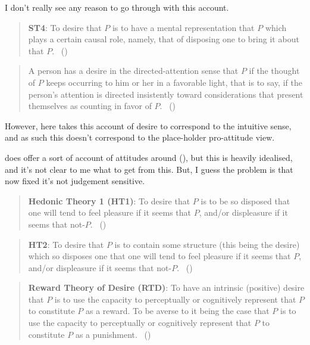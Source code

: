 \documentclass[10pt]{article}
\begin{document}
{\color{red}
  I don't really see any reason to go through with this account.
}

\begin{quote}
  \textbf{ST4}:
  To desire that \(P\) is to have a mental representation that \(P\) which plays a certain causal role, namely, that of disposing one to bring it about that \(P\).\nolinebreak
  \mbox{ }\hfill(\citeyear[24]{Schroeder:2004aa})
\end{quote}

\begin{quote}
  A person has a desire in the directed-attention sense that \(P\) if the thought of \(P\) keeps occurring to him or her in a favorable light, that is to say, if the person’s attention is directed insistently toward considerations that present themselves as counting in favor of \(P\).\nolinebreak
  \mbox{ }(\citeyear[39]{Scanlon:1998aa})
\end{quote}

However, here \citeauthor{Scanlon:1998aa} takes this account of desire to correspond to the intuitive sense, and as such this doesn't correspond to the place-holder pro-attitude view.

\citeauthor{Scanlon:1998aa} does offer a sort of account of attitudes around (\citeyear[20]{Scanlon:1998aa}), but this is heavily idealised, and it's not clear to me what to get from this.
But, I guess the problem is that now fixed it's not judgement sensitive.


\begin{quote}
  \textbf{Hedonic Theory 1 (HT1)}:
  To desire that \(P\) is to be so disposed that one will tend to feel pleasure if it seems that \(P\), and/or displeasure if it seems that not-\(P\).\nolinebreak
  \mbox{ }\hfill(\citeyear[27]{Schroeder:2004aa})
\end{quote}

\begin{quote}
  \textbf{HT2}:
  To desire that \(P\) is to contain some structure (this being the desire) which so disposes one that one will tend to feel pleasure if it seems that \(P\), and/or displeasure if it seems that not-\(P\).\nolinebreak
  \mbox{ }\hfill(\citeyear[27]{Schroeder:2004aa})
\end{quote}


\begin{quote}
  \textbf{Reward Theory of Desire (RTD)}:
  To have an intrinsic (positive) desire that \(P\) is to use the capacity to perceptually or cognitively represent that \(P\) to constitute \(P\) as a reward.
  To be averse to it being the case that \(P\) is to use the capacity to perceptually or cognitively represent that \(P\) to constitute \(P\) as a punishment.\nolinebreak
  \mbox{ }\hfill(\citeyear[131]{Schroeder:2004aa})
\end{quote}
\end{document}
